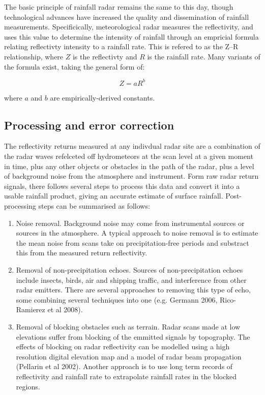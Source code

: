 The basic principle of rainfall radar remains the same to this day, though technological advances have increased the quality and dissemination of rainfall measurements. Specificically, meteorological radar measures the reflectivity, and uses this value to determine the intensity of rainfall through an empricial formula relating reflectivty intensity to a rainfall rate. This is refered to as the Z--R relationship, where \(Z\) is the reflectivty and \(R\) is the rainfall rate. Many variants of the formula exist, taking the general form of:
  
\begin{equation}
Z = aR^b
\end{equation}

where \(a\) and \(b\) are empirically-derived constants. 

\subsection{Processing and error correction}

The reflectivity returns measured at any indivdual radar site are a combination of the radar waves refelceted off hydrometeors at the scan level at a given moment in time, plus any other objects or obstacles in the path of the radar, plus a level of background noise from the atmosphere and instrument. Form raw radar return signals, there follows several steps to process this data and convert it into a usable rainfall product, giving an accurate estimate of surface rainfall. Post-processing steps can be summarised as follows:

\begin{enumerate}
\item Noise removal. Background noise may come from instrumental sources or sources in the atmosphere. A typical approach to noise removal is to estimate the mean noise from scans take on precipitation-free periods and substract this from the measured return reflectivity.

\item Removal of non-precipitation echoes. Sources of non-precipitation echoes include insects, birds, air and shipping traffic, and interference from other radar emitters. There are several approaches to removing this type of echo, some combining several techniques into one (e.g. Germann 2006, Rico-Ramierez et al 2008).

\item Removal of blocking obstacles such as terrain. Radar scans made at low elevations suffer from blocking of the emmitted signals by topography. The effects of blocking on radar reflectivity can be modelled using a high resolution digital elevation map and a model of radar beam propagation (Pellarin et al 2002). Another approach is to use long term records of reflectivity and rainfall rate to extrapolate rainfall rates in the blocked regions.

\end{enumerate}

